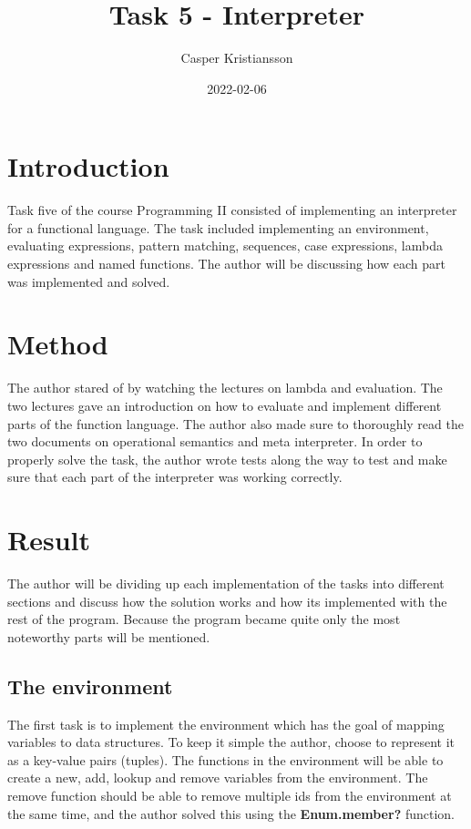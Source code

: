 \documentclass[a4paper,11pt]{article}
\begin{document}
\title{
    \textbf{Task 5 - Interpreter}
}
\author{Casper Kristiansson}
\date{2022-02-06}

\maketitle

\section*{Introduction}
Task five of the course Programming II consisted of implementing an interpreter for a functional language. The task included implementing an environment, evaluating expressions, pattern matching, sequences, case expressions, lambda expressions and named functions. The author will be discussing how each part was implemented and solved.

\section*{Method}
The author stared of by watching the lectures on lambda and evaluation. The two lectures gave an introduction on how to evaluate and implement different parts of the function language. The author also made sure to thoroughly read the two documents on operational semantics and meta interpreter. In order to properly solve the task, the author wrote tests along the way to test and make sure that each part of the interpreter was working correctly.

\section*{Result}
The author will be dividing up each implementation of the tasks into different sections and discuss how the solution works and how its implemented with the rest of the program. Because the program became quite only the most noteworthy parts will be mentioned.

\subsection*{The environment}
The first task is to implement the environment which has the goal of mapping variables to data structures. To keep it simple the author, choose to represent it as a key-value pairs (tuples). The functions in the environment will be able to create a new, add, lookup and remove variables from the environment. The remove function should be able to remove multiple ids from the environment at the same time, and the author solved this using the \textbf{Enum.member?} function.
\end{document}
